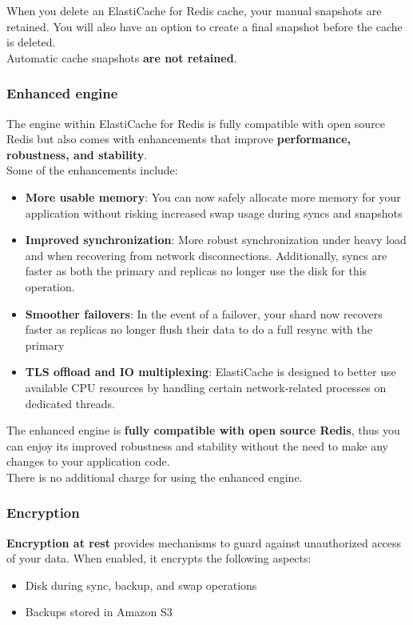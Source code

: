 \documentclass[12pt, letterpaper, twoside]{article}
\begin{document}
When you delete an ElastiCache for Redis cache, your manual snapshots are retained. You will also have an option to create a final 
snapshot before the cache is deleted.\\
Automatic cache snapshots \textbf{are not retained}.

\subsubsection{Enhanced engine}
The engine within ElastiCache for Redis is fully compatible with open source Redis but also comes with enhancements that improve 
\textbf{performance, robustness, and stability}.\\
Some of the enhancements include:
\begin{itemize}
	\item \textbf{More usable memory}: You can now safely allocate more memory for your application without risking increased swap usage during 
		syncs and snapshots
	\item \textbf{Improved synchronization}: More robust synchronization under heavy load and when recovering from network 
		disconnections. Additionally, syncs are faster as both the primary and replicas no longer use the disk for this operation.
	\item \textbf{Smoother failovers}: In the event of a failover, your shard now recovers faster as replicas no longer flush their 
		data to do a full resync with the primary
	\item \textbf{TLS offload and IO multiplexing}: ElastiCache is designed to better use available CPU resources by handling certain 
		network-related processes on dedicated threads.
\end{itemize}

The enhanced engine is \textbf{fully compatible with open source Redis}, thus you can enjoy its improved robustness and stability without the 
need to make any changes to your application code.\\

There is no additional charge for using the enhanced engine.\\

\subsubsection{Encryption}
\textbf{Encryption at rest }provides mechanisms to guard against unauthorized access of your data. When enabled, it encrypts the 
following aspects:
\begin{itemize}
	\item Disk during sync, backup, and swap operations
	\item Backups stored in Amazon S3
\end{itemize}
\end{document}
